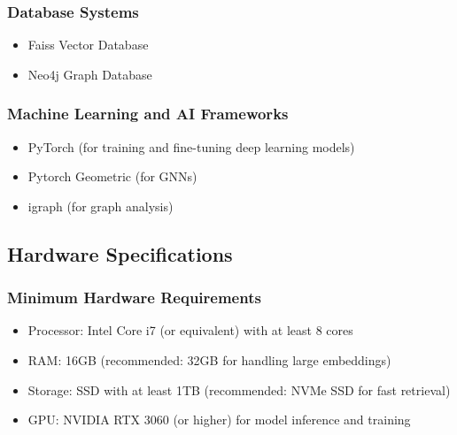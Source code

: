 \documentclass[a4paper,12pt]{article}
\begin{document}
\subsubsection{Database Systems}
\begin{itemize}
    \item Faiss Vector Database
    \vspace{-10pt}
    \item Neo4j Graph Database
\end{itemize}

\subsubsection{Machine Learning and AI Frameworks}
\begin{itemize}
    \item PyTorch (for training and fine-tuning deep learning models)
    \vspace{-10pt}
    \item Pytorch Geometric (for GNNs)
    \vspace{-10pt}
    \item igraph (for graph analysis)
\end{itemize}

\subsection{Hardware Specifications}
\subsubsection{Minimum Hardware Requirements}
\begin{itemize}
    \item Processor: Intel Core i7 (or equivalent) with at least 8 cores
    \vspace{-10pt}
    \item RAM: 16GB (recommended: 32GB for handling large embeddings)
    \vspace{-10pt}
    \item Storage: SSD with at least 1TB (recommended: NVMe SSD for fast retrieval)
    \vspace{-10pt}
    \item GPU: NVIDIA RTX 3060 (or higher) for model inference and training
\end{itemize}
\newpage
\end{document}
